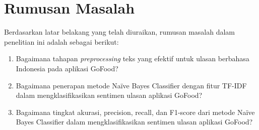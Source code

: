 \section{Rumusan Masalah}

Berdasarkan latar belakang yang telah diuraikan, rumusan masalah dalam penelitian ini adalah sebagai berikut:

\begin{enumerate}
  \item Bagaimana tahapan \emph{preprocessing} teks yang efektif untuk ulasan berbahasa Indonesia pada aplikasi GoFood?
  \item Bagaimana penerapan metode Na\"ive Bayes Classifier dengan fitur TF-IDF dalam mengklasifikasikan sentimen ulasan aplikasi GoFood?
  \item Bagaimana tingkat akurasi, precision, recall, dan F1-score dari metode Na\"ive Bayes Classifier dalam mengklasifikasikan sentimen ulasan aplikasi GoFood?
\end{enumerate}
